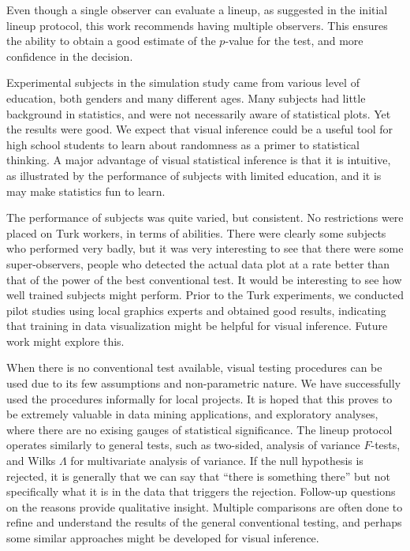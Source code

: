 \documentclass[12pt]{article}
\begin{document}

Even though a single observer can evaluate a lineup, as suggested in the initial lineup protocol, this work recommends having multiple observers. This ensures the ability to obtain a good estimate of the $p$-value for the test, and more confidence in the decision.

Experimental subjects in the simulation study came from various level of education, both genders and many different ages. Many subjects had little background in statistics, and were not necessarily aware of statistical plots. Yet the results were good. We expect that visual inference could be a useful tool for high school students to learn about randomness as a primer to statistical thinking. A major advantage of visual statistical inference is that it is intuitive, as illustrated by the performance of subjects with limited education, and it is may make statistics fun to learn. 

The performance of subjects was quite varied, but consistent. No restrictions were placed on Turk workers, in terms of abilities. There were clearly some subjects who performed very badly, but it was very interesting to see that there were some super-observers, people who detected the actual data plot at a rate better than that of the power of the best conventional test. 
 It would be interesting to see how well trained subjects might perform. Prior to the Turk experiments, we conducted pilot studies using local graphics experts and obtained good results, indicating that training in data visualization might be helpful for visual inference. Future work might explore this.


When there is no conventional test available, visual testing procedures can be used due to its few assumptions and non-parametric nature. We have successfully used the procedures informally for local projects. It is hoped that this proves to be extremely valuable in data mining applications, and exploratory analyses, where there are no exising gauges of statistical significance. The lineup protocol operates similarly to general tests, such as two-sided, analysis of variance $F$-tests, and Wilks $\Lambda$ for multivariate analysis of variance. If the null hypothesis is rejected, it is generally that we can say that ``there is something there'' but not specifically what it is in the data that triggers the rejection. Follow-up questions on the reasons provide qualitative insight. Multiple comparisons are often done to refine and understand the results of the general conventional testing, and perhaps some similar approaches might be developed for visual inference. 
\end{document}
